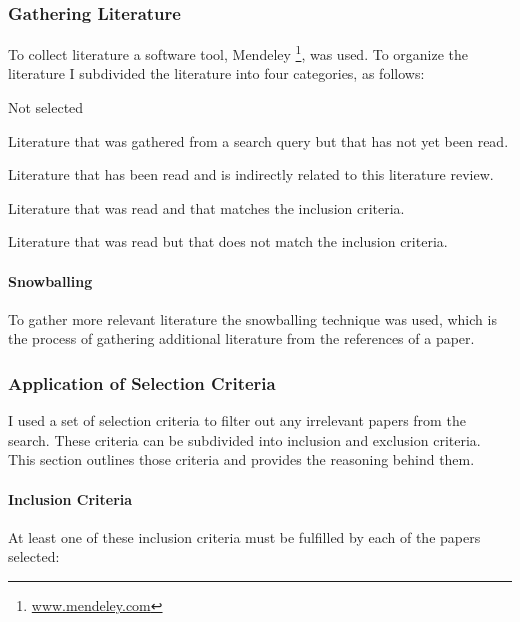 		\subsubsection{Gathering Literature}
			To collect literature a software tool, Mendeley \footnote{\url{www.mendeley.com}}, was used.
			To organize the literature I subdivided the literature into four categories, as follows:
			\begin{aligneddescription}{Not selected}
				\item[Unread]       Literature that was gathered from a search query but that has not yet been read.
				\item[Related]      Literature that has been read and is indirectly related to this literature review.
				\item[Selected]     Literature that was read and that matches the inclusion criteria.
				\item[Not selected] Literature that was read but that does not match the inclusion criteria.
			\end{aligneddescription}

			\paragraph{Snowballing}
				To gather more relevant literature the snowballing technique was used, which is the process of gathering additional literature from the references of a paper.

		\subsubsection{Application of Selection Criteria}
			I used a set of selection criteria to filter out any irrelevant papers from the search.
			These criteria can be subdivided into inclusion and exclusion criteria.
			This section outlines those criteria and provides the reasoning behind them.
			
			\paragraph{Inclusion Criteria}
				At least one of these inclusion criteria must be fulfilled by each of the papers selected:
			
